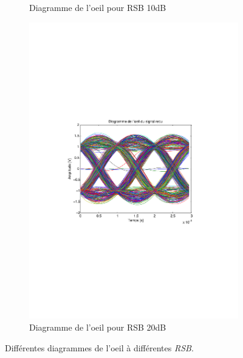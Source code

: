\documentclass[a4paper,11pt]{article}
\begin{document}
\begin{figure}
\begin{subfigure}{.5\textwidth}
  		\caption{Diagramme de l'oeil pour RSB 10dB}
  		\label{fig:q10E10}
	\end{subfigure}
	\begin{subfigure}{.5\textwidth}
  		\centering
  		\includegraphics[width=1\linewidth]{Q10-EbNo20.pdf}
  		\caption{Diagramme de l'oeil pour RSB 20dB}
  		\label{fig:q10E20}
	\end{subfigure}
	\caption{Différentes diagrammes de l'oeil à différentes \emph{RSB}.}
	\label{fig:q10E}
\end{figure}
\end{document}
